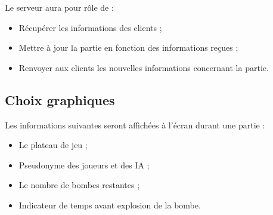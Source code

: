 Le serveur aura pour rôle de :
\begin{itemize}
	\item Récupérer les informations des clients ;
	\item Mettre à jour la partie en fonction des informations reçues ;
	\item Renvoyer aux clients les nouvelles informations concernant la partie.
\end{itemize}

\subsection{Choix  graphiques}

Les informations suivantes seront affichées à l'écran durant une partie :
\begin{itemize}
  \item Le plateau de jeu ;
  \item Pseudonyme des joueurs et des IA ;
  \item Le nombre de bombes restantes ;
  \item Indicateur de temps avant explosion de la bombe.
\end{itemize}

